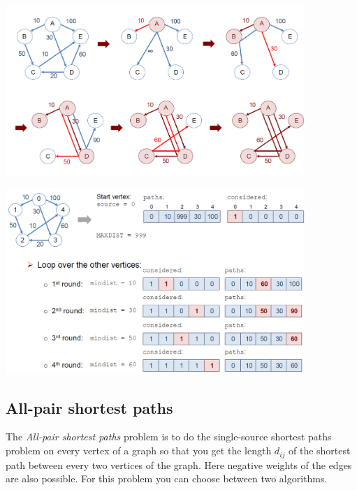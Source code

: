 \begin{center}\includegraphics[width=0.85\textwidth]{img/graphs/DijkstraGraph.png}\end{center}

\begin{center}\includegraphics[width=0.85\textwidth]{img/graphs/DijkstraVectorGraph.png}\end{center}

%

\subsection{All-pair shortest paths}

The \emph{All-pair shortest paths} problem is to do the single-source shortest paths problem on every vertex of a graph so that you get the length $d_{ij}$ of the shortest path between every two vertices of the graph. Here negative weights of the edges are also possible. For this problem you can choose between two algorithms.

